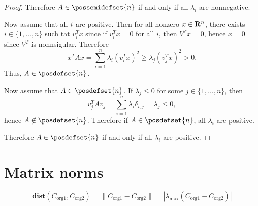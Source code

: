 \begin{itemize}
\begin{proof}
Therefore $A\in\possemidefset{n}$ if and only if all $\lambda_i$ are nonnegative.

Now assume that all $\label_i$ are positive.
Then for all nonzero $x\in\mathbf{R}^n$,
there exists $i\in\{1,\ldots,n\}$ such tat $v_i^Tx$
since if $v_i^Tx=0$ for all $i$, then
$V^T x = 0$, hence $x=0$ since $V^T$ is nonnsigular.
Therefore
\begin{equation}
x^T A x = \sum_{i=1}^n \lambda_i (v_i^T x)^2
\geq \lambda_j (v_j^T x)^2 > 0.
\end{equation}
Thus, $A\in\posdefset{n}$.

Now assume that $A\in\posdefset{n}$.
If $\lambda_j \leq 0$ for some $j\in\{1,\ldots,n\}$,
then
\begin{equation}
v_j^T A v_j
= \sum_{i=1}^n \lambda_i \delta_{i,j}
= \lambda_j \leq 0,
\end{equation}
hence $A\not\in\posdefset{n}$. Therefore if $A\in\posdefset{n}$, all $\lambda_i$ are positive.

Therefore $A\in\posdefset{n}$ if and only if all $\lambda_i$ are positive.

\end{proof}

\end{itemize}

\section{Matrix norms}

\begin{equation}
\mathbf{dist}( C_\mathrm{org 1}, C_\mathrm{org 2} ) =
\|C_\mathrm{org 1} - C_\mathrm{org 2} \|
= |\lambda_\mathrm{max}(C_\mathrm{org 1} - C_\mathrm{org 2})|
\end{equation}
